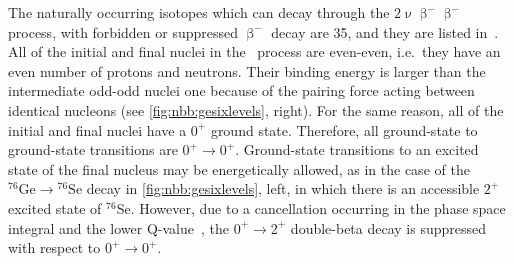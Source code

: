 The naturally occurring isotopes which can decay through the $2\upnu\upbeta^-\upbeta^-$
process, with forbidden or suppressed $\upbeta^-$ decay are 35, and they are listed
in~\cite{Giunti2007}. All of the initial and final nuclei in the \nnbbm\ process are
even-even, i.e.~they have an even number of protons and neutrons. Their binding energy is
larger than the intermediate odd-odd nuclei one because of the pairing force acting
between identical nucleons (see \cref{fig:nbb:gesixlevels}, right). For the same reason,
all of the initial and final nuclei have a $0^+$ ground state.  Therefore, all
ground-state to ground-state transitions are $0^+\rightarrow0^+$. Ground-state transitions
to an excited state of the final nucleus may be energetically allowed, as in the case of
the $^{76}\text{Ge} \rightarrow {^{76}\text{Se}}$ decay in \cref{fig:nbb:gesixlevels},
left, in which there is an accessible $2^+$ excited state of $^{76}$Se. However, due to a
cancellation occurring in the phase space integral and the lower
Q-value~\cite{Tomoda1991}, the $0^+\rightarrow2^+$ double-beta decay is suppressed with
respect to $0^+\rightarrow0^+$.

